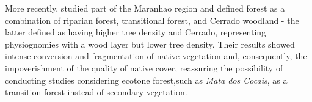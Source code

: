 












More recently, \citet{GARCIA201716} studied part of the Maranhao region and defined forest as a combination of riparian forest, transitional forest, and Cerrado woodland - the latter defined as having higher tree density and Cerrado, representing physiognomies with a wood layer but lower tree density. Their results showed intense conversion and fragmentation of native vegetation and, consequently, the impoverishment of the quality of native cover, reassuring the possibility of conducting studies considering ecotone forest,such as \textit{Mata dos Cocais}, as a transition forest instead of secondary vegetation.


